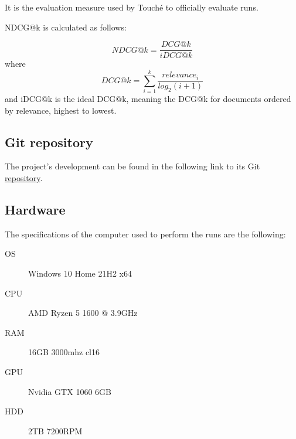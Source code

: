 	It is the evaluation measure used by Touché to officially evaluate runs.

	NDCG@k is calculated as follows:

	$$
	NDCG@k = \frac{DCG@k}{iDCG@k}
	$$
	where
	$$
	DCG@k = \sum_{i=1}^{k}\frac{relevance_i}{log_2(i+1)}
	$$
	and iDCG@k is the ideal DCG@k, meaning the DCG@k for documents ordered by relevance, highest to lowest.


\subsection{Git repository}

	The project’s development can be found in the following link to its Git \href{https://bitbucket.org/upd-dei-stud-prj/seupd2122-kueri/src/master/}{repository}.
	

\subsection{Hardware}

	The specifications of the computer used to perform the runs are the following:
	\begin{description}
		\item[OS] Windows 10 Home 21H2 x64
		\item[CPU] AMD Ryzen 5 1600 @ 3.9GHz
		\item[RAM] 16GB 3000mhz cl16
		\item[GPU] Nvidia GTX 1060 6GB
		\item[HDD] 2TB 7200RPM
	\end{description}